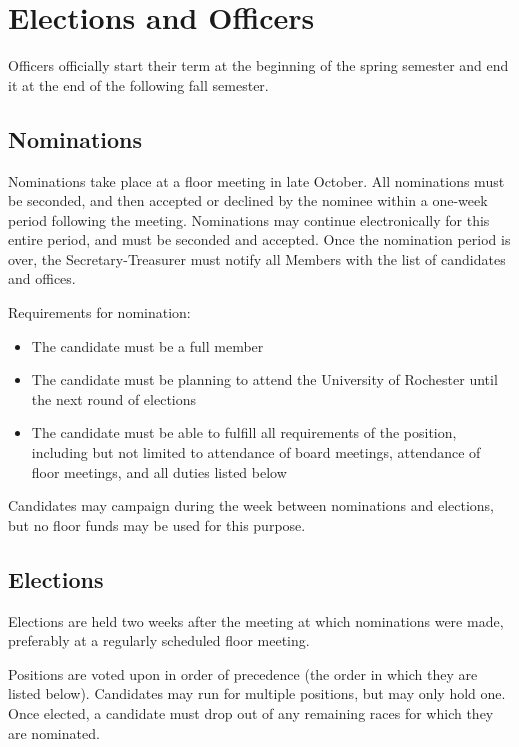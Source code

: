 \section{Elections and Officers}
\label{sec:elections-and-officers}

Officers officially start their term at the beginning of the spring semester and end it at the end of the following fall semester.



	\subsection{Nominations}

	Nominations take place at a floor meeting in late October. All nominations must be seconded, and then accepted or declined by the nominee within a one-week period following the meeting. Nominations may continue electronically for this entire period, and must be seconded and accepted. Once the nomination period is over, the Secretary-Treasurer must notify all Members with the list of candidates and offices.

	Requirements for nomination:
	\begin{itemize}
		\item The candidate must be a full member
		\item The candidate must be planning to attend the University of Rochester until the next round of elections
		\item The candidate must be able to fulfill all requirements of the position, including but not limited to attendance of board meetings, attendance of floor meetings, and all duties listed below
	\end{itemize}

	Candidates may campaign during the week between nominations and elections, but no floor funds may be used for this purpose.



	\subsection{Elections}

	Elections are held two weeks after the meeting at which nominations were made, preferably at a regularly scheduled floor meeting.

	Positions are voted upon in order of precedence (the order in which they are listed below). Candidates may run for multiple positions, but may only hold one. Once elected, a candidate must drop out of any remaining races for which they are nominated.

